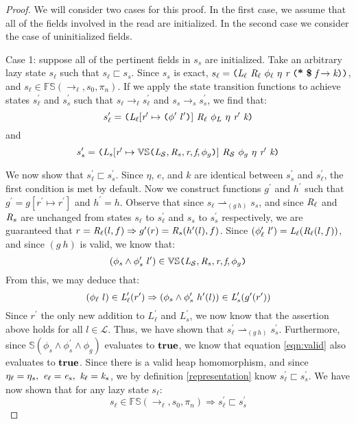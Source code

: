 \begin{proof}
We will consider two cases for this proof. In the first case, we assume that all of the fields involved in the read are initialized. In the second case we consider the case of uninitialized fields. 

Case 1: suppose all of the pertinent fields in $s_s$ are initialized. Take an arbitrary lazy state $s_\ell$ such that $s_\ell \sqsubset s_s$. Since $s_s$ is exact,  $s_\ell = \lp \cfgnt{L}_{\ell}\ \cfgnt{R}_{\ell}\ \phi_\ell\ \eta\ \cfgnt{r}\ \lp \cfgt{*}\ \cfgt{\$}\ \cfgnt{f} \rightarrow \cfgnt{k} \rp \rp$, and $s_\ell \in \mathbb{FS}(\rightarrow_{\ell},s_0,\pi_n)$. If we apply the state transition functions to achieve states $s_\ell^\prime$ and $s_s^\prime$ such that $s_\ell \rightarrow_\ell s_\ell^\prime$ and  $s_s \rightarrow_s s_s^\prime$, we find that:
$$s_\ell^\prime = \lp \cfgnt{L}_{\ell} [\cfgnt{r}^\prime \mapsto \lp\phi^\prime\ l^\prime\rp]\ \cfgnt{R}_{\ell}\ \phi_L\ \eta\ \cfgnt{r}^\prime\ \cfgnt{k}\rp $$
 and 
 $$ s_s^\prime = \lp \cfgnt{L}_{s}[\cfgnt{r}^\prime \mapsto \mathbb{VS}\lp \cfgnt{L}_{\mathcal{S}},\cfgnt{R}_{s},\cfgnt{r},\cfgnt{f},\phi_g\rp ]\ \cfgnt{R}_{\mathcal{S}}\ \phi_g\ \eta\ \cfgnt{r}^\prime\ \cfgnt{k}\rp $$

We now show that $s_\ell^\prime \sqsubset s_s^\prime$. Since $\eta$, $e$, and $k$ are identical between $s_s^\prime$ and $s_\ell^\prime $, the first condition is met by default. Now we construct functions $g^\prime$ and $h^\prime$ such that $g^\prime = g[ r^\prime \mapsto r^\prime]$ and $h^\prime = h$. Observe that since $s_\ell \rightharpoonup_{(g\ h)} s_s$, and since $\emph{R}_\ell$ and $\emph{R}_s$ are unchanged from states $s_\ell$ to $s_\ell^\prime$ and $s_s$ to $s_s^\prime$ respectively, we are guaranteed that $ r = \emph{R}_\ell(l,f) \Rightarrow g^\prime(r) = \emph{R}_s(h^\prime(l),f)$. Since $(\phi_\ell^\prime\ l^\prime) =  \emph{L}_\ell(\emph{R}_\ell(l,f))$, and since $(g\ h)$ is valid, we know that:
 $$(\phi_s \wedge \phi_s^\prime\ l^\prime) \in \mathbb{VS}\texttt{(} \emph{L}_{\mathcal{S}},\emph{R}_{s},\emph{r},\emph{f},\phi_g\texttt{)}$$ 
From this, we may deduce that:
$$ (\phi_\ell\ l) \in \cfgnt{L}_\ell^\prime(r^\prime) \Rightarrow (\phi_s \wedge \phi_s^\prime\ h^\prime(l))\in \cfgnt{L}_s^\prime(g^\prime(r^\prime))$$
Since $r^\prime$ the only new addition to $L_\ell^\prime$ and $L_s^\prime$, we now know that the assertion above holds for all $l \in \mathcal{L}$. Thus, we have shown that $s_\ell^\prime \rightharpoonup_{(g\ h)} s_s^\prime$. Furthermore, since $\mathbb{S}(\phi_s\wedge\phi_s^\prime\wedge \phi_g)$ evaluates to $\textbf{true}$, we know that equation \ref{eqn:valid} also evaluates to $\textbf{true}$. Since there is a valid heap homomorphism, and since $\eta_{\ell} = \eta_{s} ,\ \emph{e}_{\ell} = \emph{e}_{s} ,\ \emph{k}_{\ell} = \emph{k}_{s}$, we  by definition \ref{representation} know $s_\ell^\prime \sqsubset s_s^\prime$. We have now shown that for any lazy state $s_\ell$: 
$$s_\ell \in \mathbb{FS}(\rightarrow_{\ell},s_0,\pi_n) \Rightarrow s_\ell^\prime \sqsubset s_s^\prime$$


\end{proof}
